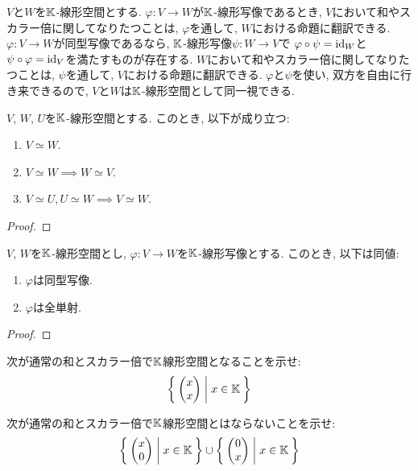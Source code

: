 \begin{remark}
  $V$と$W$を$\mathbb{K}$-線形空間とする.
  $\varphi\colon V\to W$が$\mathbb{K}$-線形写像であるとき,
  $V$において和やスカラー倍に関してなりたつことは,
  $\varphi$を通して, $W$における命題に翻訳できる.
  $\varphi\colon V\to W$が同型写像であるなら,
  $\mathbb{K}$-線形写像$\psi\colon W\to V$で
  $\varphi\circ \psi=\operatorname{id}_W$と
  $\psi\circ \varphi=\operatorname{id}_V$を満たすものが存在する.
  $W$において和やスカラー倍に関してなりたつことは,
  $\psi$を通して, $V$における命題に翻訳できる.
  $\varphi$と$\psi$を使い, 双方を自由に行き来できるので,
  $V$と$W$は$\mathbb{K}$-線形空間として同一視できる.
\end{remark}

\begin{prop}
  $V$, $W$, $U$を$\mathbb{K}$-線形空間とする.
  このとき, 以下が成り立つ:
  \begin{enumerate}
  \item $V\simeq W$.
  \item $V\simeq W \implies W\simeq V$.
  \item $V\simeq U, U\simeq W \implies V\simeq W$.
  \end{enumerate}
\end{prop}
\begin{proof}\end{proof}

\begin{prop}
  $V$, $W$を$\mathbb{K}$-線形空間とし, $\varphi\colon V\to W$を$\mathbb{K}$-線形写像とする.
  このとき, 以下は同値:
  \begin{enumerate}
  \item $\varphi$は同型写像.
  \item $\varphi$は全単射.
  \end{enumerate}
\end{prop}
\begin{proof}\end{proof}

\begin{quiz}
  次が通常の和とスカラー倍で$\mathbb{K}$線形空間となることを示せ:
  \begin{align*}
    \Set{\begin{pmatrix}x\\x\end{pmatrix}|x\in\mathbb{K}}
  \end{align*}
\end{quiz}

\begin{quiz}
  次が通常の和とスカラー倍で$\mathbb{K}$線形空間とはならないことを示せ:
  \begin{align*}
    \Set{\begin{pmatrix}x\\0\end{pmatrix}|x\in\mathbb{K}}
    \cup \Set{\begin{pmatrix}0\\x\end{pmatrix}|x\in\mathbb{K}}
  \end{align*}
\end{quiz}


